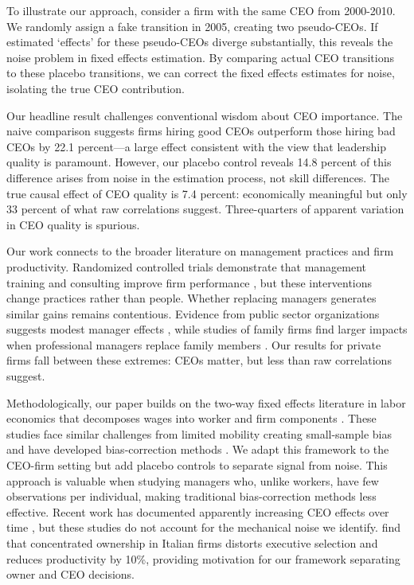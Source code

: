 \documentclass[11pt,a4paper]{article}
\begin{document}
To illustrate our approach, consider a firm with the same CEO from 2000-2010. We randomly assign a fake transition in 2005, creating two pseudo-CEOs. If estimated `effects' for these pseudo-CEOs diverge substantially, this reveals the noise problem in fixed effects estimation. By comparing actual CEO transitions to these placebo transitions, we can correct the fixed effects estimates for noise, isolating the true CEO contribution.

Our headline result challenges conventional wisdom about CEO importance. The naive comparison suggests firms hiring good CEOs outperform those hiring bad CEOs by 22.1 percent—a large effect consistent with the view that leadership quality is paramount. However, our placebo control reveals 14.8 percent of this difference arises from noise in the estimation process, not skill differences. The true causal effect of CEO quality is 7.4 percent: economically meaningful but only 33 percent of what raw correlations suggest. Three-quarters of apparent variation in CEO quality is spurious.

Our work connects to the broader literature on management practices and firm productivity. Randomized controlled trials demonstrate that management training and consulting improve firm performance \citep{bloom2013does}, but these interventions change practices rather than people. Whether replacing managers generates similar gains remains contentious. Evidence from public sector organizations suggests modest manager effects \citep{fenizia2022managers, janke2024role}, while studies of family firms find larger impacts when professional managers replace family members \citep{bennedsen2007inside}. Our results for private firms fall between these extremes: CEOs matter, but less than raw correlations suggest.

Methodologically, our paper builds on the two-way fixed effects literature in labor economics that decomposes wages into worker and firm components \citep{Abowd1999Econometrica, Card2018JoLE}. These studies face similar challenges from limited mobility creating small-sample bias \citep{andrews2008high} and have developed bias-correction methods \citep{Bonhomme2023-dx, gaure2014correlation}. We adapt this framework to the CEO-firm setting but add placebo controls to separate signal from noise. This approach is valuable when studying managers who, unlike workers, have few observations per individual, making traditional bias-correction methods less effective. Recent work has documented apparently increasing CEO effects over time \citep{quigley2015has}, but these studies do not account for the mechanical noise we identify. \citet{lippi2014corporate} find that concentrated ownership in Italian firms distorts executive selection and reduces productivity by 10\%, providing motivation for our framework separating owner and CEO decisions.
\end{document}
